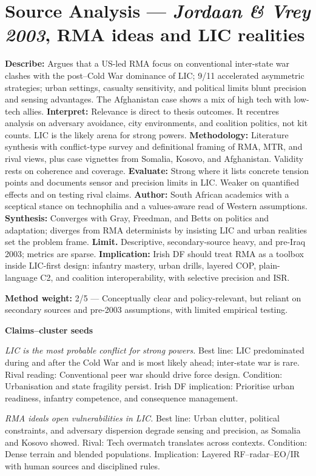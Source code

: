\section*{Source Analysis — \textit{Jordaan & Vrey 2003}, RMA ideas and LIC realities}
\textbf{Describe:} Argues that a US-led RMA focus on conventional inter-state war clashes with the post–Cold War dominance of LIC; 9/11 accelerated asymmetric strategies; urban settings, casualty sensitivity, and political limits blunt precision and sensing advantages. The Afghanistan case shows a mix of high tech with low-tech allies.
\textbf{Interpret:} Relevance is direct to thesis outcomes. It recentres analysis on adversary avoidance, city environments, and coalition politics, not kit counts. LIC is the likely arena for strong powers.
\textbf{Methodology:} Literature synthesis with conflict-type survey and definitional framing of RMA, MTR, and rival views, plus case vignettes from Somalia, Kosovo, and Afghanistan. Validity rests on coherence and coverage.
\textbf{Evaluate:} Strong where it lists concrete tension points and documents sensor and precision limits in LIC. Weaker on quantified effects and on testing rival claims.
\textbf{Author:} South African academics with a sceptical stance on technophilia and a values-aware read of Western assumptions.
\textbf{Synthesis:} Converges with Gray, Freedman, and Betts on politics and adaptation; diverges from RMA determinists by insisting LIC and urban realities set the problem frame.
\textbf{Limit.} Descriptive, secondary-source heavy, and pre-Iraq 2003; metrics are sparse.
\textbf{Implication:} Irish DF should treat RMA as a toolbox inside LIC-first design: infantry mastery, urban drills, layered COP, plain-language C2, and coalition interoperability, with selective precision and ISR.

\textbf{Method weight:} 2/5 — Conceptually clear and policy-relevant, but reliant on secondary sources and pre-2003 assumptions, with limited empirical testing.

\textbf{Claims–cluster seeds}

\textit{LIC is the most probable conflict for strong powers.} Best line: LIC predominated during and after the Cold War and is most likely ahead; inter-state war is rare. Rival reading: Conventional peer war should drive force design. Condition: Urbanisation and state fragility persist. Irish DF implication: Prioritise urban readiness, infantry competence, and consequence management.

\textit{RMA ideals open vulnerabilities in LIC.} Best line: Urban clutter, political constraints, and adversary dispersion degrade sensing and precision, as Somalia and Kosovo showed. Rival: Tech overmatch translates across contexts. Condition: Dense terrain and blended populations. Implication: Layered RF–radar–EO/IR with human sources and disciplined rules.

